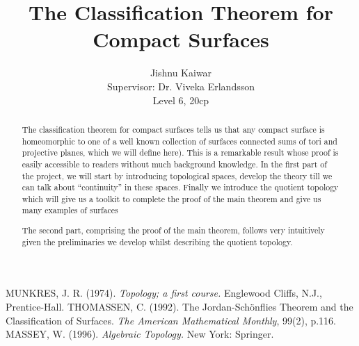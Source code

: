 \documentclass[11pt,twoside,a4paper]{article}
\title{The Classification Theorem for Compact Surfaces}
\author{Jishnu Kaiwar \\ [1cm]{\small Supervisor: Dr. Viveka Erlandsson} \\ Level 6, 20cp}
\theoremstyle{plain}
\theoremstyle{definition}
\begin{document}
\maketitle

\begin{abstract}
  The classification theorem for compact surfaces tells us that any
  compact surface is homeomorphic to one of a well known collection of
  surfaces connected sums of tori and projective planes, which we will define
  here). This is a remarkable result whose proof is easily accessible
  to readers without much background knowledge. In the first part of
  the project, we will start by introducing topological spaces,
  develop the theory till we can talk about ``continuity'' in these
  spaces. Finally we introduce the quotient topology which will give
  us a toolkit to complete the proof of the main theorem and give us many examples of surfaces

  The second part, comprising the proof of the main theorem, follows
  very intuitively given the preliminaries we develop whilst
  describing the quotient topology.
\end{abstract}

\newpage

\tableofcontents






\begin{thebibliography}{9}
  MUNKRES, J. R. (1974). \emph{Topology; a first course.} Englewood Cliffs, N.J., Prentice-Hall.
  THOMASSEN, C. (1992). The Jordan-Sch\"onflies Theorem and the Classification of Surfaces. \emph{The American Mathematical Monthly}, 99(2), p.116.
  MASSEY, W. (1996). \emph{Algebraic Topology.} New York: Springer.
\end{thebibliography}
\end{document}
